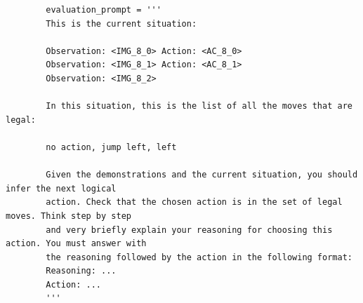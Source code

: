 \begin{listing}
    \caption{
        The dynamic part of the evaluation prompt containing the evaluation trajectory.
        While stepping through an environment, we append this prompt to the one in \cref{code:frozen-prompt} in every evaluation step (\eg for the 3rd step here), again replacing the observation and action placeholders with the actual observations and actions.
        This example also shows the legal moves (lines $8$ to $10$) and uses chain-of-thought prompting (lines $12$ to $17$, \citet{wei2022chain}), both of which may be omitted depending on our ablations in \cref{app:additional-results:ablations} (which can vary for each model-task combination).
    }
    \label{code:dynamic-prompt}
    \begin{verbatim}
        evaluation_prompt = '''
        This is the current situation:
        
        Observation: <IMG_8_0> Action: <AC_8_0>
        Observation: <IMG_8_1> Action: <AC_8_1>
        Observation: <IMG_8_2>
        
        In this situation, this is the list of all the moves that are legal:
        
        no action, jump left, left
        
        Given the demonstrations and the current situation, you should infer the next logical
        action. Check that the chosen action is in the set of legal moves. Think step by step
        and very briefly explain your reasoning for choosing this  action. You must answer with
        the reasoning followed by the action in the following format:
        Reasoning: ...
        Action: ...
        '''
    \end{verbatim}
\end{listing}

